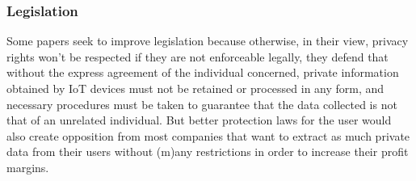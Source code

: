\documentclass[conference]{IEEEtran}
\begin{document}


\subsubsection{Legislation}

Some papers seek to improve legislation \cite{WEBER2015618, FabianoInternet}
because otherwise, in their view, privacy rights won't be respected if they
are not enforceable legally, they defend that without the express agreement
of the individual concerned, private information obtained by IoT devices
must not be retained or processed in any form, and necessary procedures must
be taken to guarantee that the data collected is not that of an unrelated
individual. But better protection laws for the user would also create opposition
from most companies that want to extract as much private data from their
users without (m)any restrictions in order to increase their profit margins.
\end{document}
